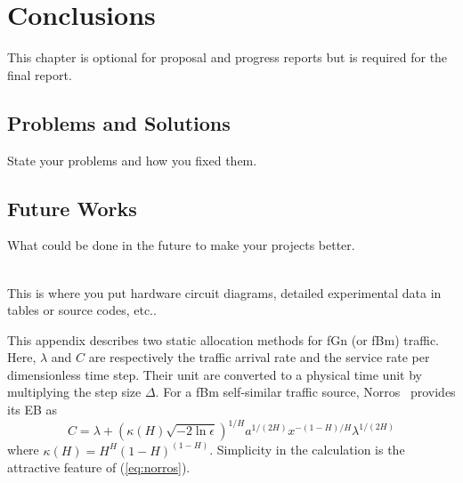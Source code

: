 \documentclass[12pt,oneside,openright,a4paper]{cpe-english-project}
\begin{document}
\chapter{Conclusions}

This chapter is optional for proposal and progress reports but 
is required for the final report.\cite{shen04}

\section{Problems and Solutions}
State your problems and how you fixed them.

\section{Future Works}
What could be done in the future to make your projects better.


\nocite{*}



 \\

This is where you put hardware circuit diagrams, detailed experimental data in tables or source codes, etc.. \\ \bigskip



This appendix describes two static allocation methods for fGn (or fBm)
traffic. Here, $\lambda$ and $C$ are respectively the traffic arrival
rate and the service rate per dimensionless time step. Their unit are
converted to a physical time unit by multiplying the step size
$\Delta$. For a fBm self-similar traffic source,
Norros~\cite{norros95} provides its EB as
\begin{equation}\label{eq:norros}
  C = \lambda + (\kappa(H)\sqrt{-2\ln\epsilon})^{1/H}a^{1/(2H)}x^{-(1-H)/H}\lambda^{1/(2H)}
\end{equation}
where $\kappa(H) = H^H(1-H)^{(1-H)}$. Simplicity in the calculation is
the attractive feature of (\ref{eq:norros}).
\end{document}
